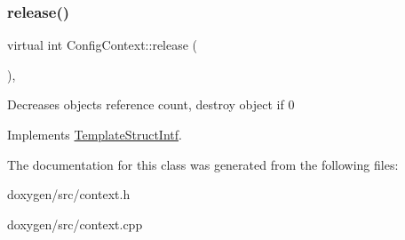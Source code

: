 \subsubsection{\texorpdfstring{release()}{release()}}
{\footnotesize\ttfamily virtual int Config\+Context\+::release (\begin{DoxyParamCaption}{ }\end{DoxyParamCaption})\hspace{0.3cm}{\ttfamily [inline]}, {\ttfamily [virtual]}}

Decreases object\textquotesingle{}s reference count, destroy object if 0 

Implements \mbox{\hyperlink{class_template_struct_intf_a3dce7dd29d3f66a8080b40578e8a5045}{Template\+Struct\+Intf}}.



The documentation for this class was generated from the following files\+:\begin{DoxyCompactItemize}
\item 
doxygen/src/context.\+h\item 
doxygen/src/context.\+cpp\end{DoxyCompactItemize}
